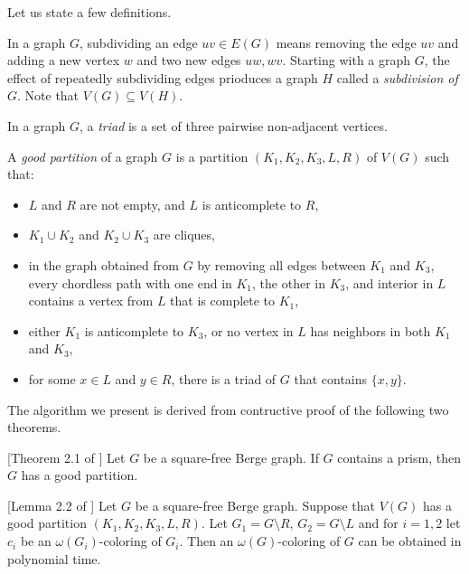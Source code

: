 Let us state a few definitions.

\begin{defnTwo}[subdivision]
  In a graph $G$, subdividing an edge $uv \in E(G)$ means removing the edge $uv$ and adding a new vertex $w$ and two new edges $uw, wv$. Starting with a graph $G$, the effect of repeatedly subdividing edges prioduces a graph $H$ called a \emph{subdivision of $G$}. Note that $V(G) \subseteq V(H)$.
\end{defnTwo}

\begin{defnTwo}[triad]
  In a graph $G$, a \emph{triad} is a set of three pairwise non-adjacent vertices.
\end{defnTwo}

\begin{defnTwo}
  A \emph{good partition} of a graph $G$ is a partition $(K_1, K_2, K_3, L, R)$ of $V(G)$ such that:
  \begin{itemize}
    \item $L$ and $R$ are not empty, and $L$ is anticomplete to $R$,
    \item $K_1 \cup K_2$ and $K_2 \cup K_3$ are cliques,
    \item in the graph obtained from $G$ by removing all edges between $K_1$ and $K_3$, every chordless path with one end in $K_1$, the other in $K_3$, and interior in $L$ contains a vertex from $L$ that is complete to $K_1$,
    \item either $K_1$ is anticomplete to $K_3$, or no vertex in $L$ has neighbors in both $K_1$ and $K_3$,
    \item for some $x \in L$ and $y \in R$, there is a triad of $G$ that contains $\{x, y\}$.
  \end{itemize}
\end{defnTwo}


The algorithm we present is derived from contructive proof of the following two theorems.

\begin{theorem}{}[Theorem 2.1 of \cite{coloringSquareFree}]
  Let $G$ be a square-free Berge graph. If $G$ contains a prism, then $G$ has a good partition.
\end{theorem}

\begin{theorem}{}[Lemma 2.2 of \cite{coloringSquareFree}]
  Let $G$ be a square-free Berge graph. Suppose that $V(G)$ has a good partition $(K_1, K_2, K_3, L, R)$. Let $G_1 = G \setminus R$, $G_2 = G \setminus L$ and for $i = 1,2$ let $c_i$ be an $\omega(G_i)$-coloring of $G_i$. Then an $\omega(G)$-coloring of $G$ can be obtained in polynomial time.
\end{theorem}

